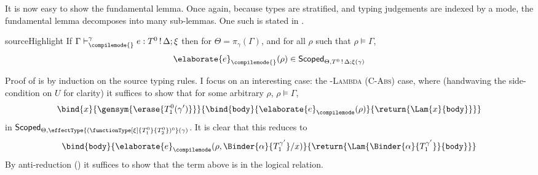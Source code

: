 It is now easy to show the fundamental lemma. Once again, because types are stratified, and typing judgements are indexed by a mode, the fundamental lemma decomposes into many sub-lemmas. One such is stated in .

\begin{lemma}{sourceHighlight} \label{lemma:fundamental}
  If $\Gamma \vdash_{\compilemode{}}^{\gamma} e: T^{0} \, ! \, \Delta ; \xi$ then for $\Theta = \pi_\gamma({\Gamma})$, and for all $\rho$ such that $\rho \vDash \Gamma$, 
  \[\elaborate{e}_{\compilemode{}}(\rho) \in \scoped[\Theta]{T^{0} \, ! \, \Delta ; \xi (\gamma)}\]
\end{lemma}

Proof of  is by induction on the source \sourceLang{} typing rules. I focus on an interesting case: the \textsc{\compilemode{}-Lambda} (\textsc{C-Abs}) case, where (handwaving the side-condition on $U$ for clarity) it suffices to show that for some arbitrary $\rho$, $\rho \vDash \Gamma$, 
\[\bind{x}{\gensym{\erase{T_1^0 (\gamma')}}}{\bind{\texttt{body}}{\elaborate{e}_{\compilemode}({\rho})}{\return{\Lam{x}{\texttt{body}}}}}\]
in $\scoped{\effectType{(\functionType[\xi]{T_1^0}{T_2^0})^0} (\gamma)}$. It is clear that this reduces to
\[{\bind{\texttt{body}}{\elaborate{e}_{\compilemode}({\rho, \Binder{\alpha}{T_1^{\gamma'}} / x})}{\return{\Lam{\Binder{\alpha}{T_1^{\gamma'}}}{\texttt{body}}}}}\]
 By anti-reduction () it suffices to show that the term above is in the logical relation. 
 
